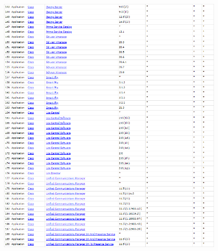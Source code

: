 \documentclass[11t]{article}
\begin{document}
\begin{figure}[H]
\begin{minipage}{0.49\textwidth}
        \includegraphics[width=1\textwidth]{images/produtosAfetadosPergunta2_4.png}
    \end{minipage}
\end{figure}
\end{document}
